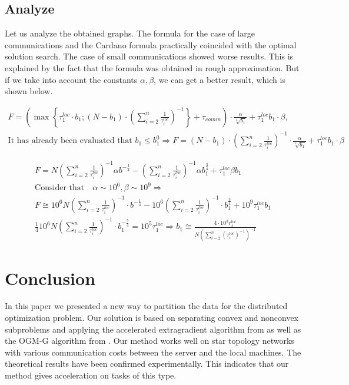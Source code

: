 \documentclass{article}
\begin{document}
\subsection{Analyze}
Let us analyze the obtained graphs. The formula for the case of large communications and the Cardano formula practically coincided with the optimal solution search. The case of small communications showed worse results. This is explained by the fact that the formula was obtained in rough approximation. But if we take into account the constants $\alpha, \beta$, we can get a better result, which is shown below.



\begin{gather*}
    F=\left(\max \left\{\tau_1^{loc} \cdot b_1 ;\left(N-b_1\right) \cdot\left(\sum_{i=2}^n \frac{1}{\tau_i^{loc}}\right)^{-1}\right\}+\tau_{comm}\right) \cdot \frac{\alpha}{\sqrt[4]{b_1}}+\tau_1^{loc} b_1 \cdot \beta, \\
    \text {It has already been evaluated that } b_1 \leq b_1^0 \Rightarrow F=\left(N-b_1\right)\cdot \left(\sum_{i=2}^n \frac{1}{\tau_i^{loc}}\right)^{-1} \cdot \frac{\alpha}{\sqrt[4]{b_1}}+\tau_1^{loc} b_1 \cdot \beta
\end{gather*}


\begin{gather*}
    F=N\left(\sum_{i=2}^n \frac{1}{\tau_i^{loc}}\right)^{-1} \alpha b^{-\frac{1}{4}}-\left(\sum_{i=2}^n \frac{1}{\tau_i^{loc}}\right)^{-1} \alpha b_1^{\frac{3}{4}}+\tau_1^{l o c} \beta b_1 \\
    \text {Consider that} \quad \alpha \sim 10^6, \beta \sim 10^9 \Rightarrow \\ 
    F \cong 10^6 N \left(\sum_{i=2}^n \frac{1}{\tau_i^{loc}}\right)^{-1} \cdot b^{-\frac{1}{4}}-10^6 \left(\sum_{i=2}^n \frac{1}{\tau_i^{loc}}\right)^{-1} \cdot b_1^{\frac{3}{4}}+10^9 \tau_1^{loc} b_1 \\
    \frac{1}{4} 10^6 N \left(\sum_{i=2}^n \frac{1}{\tau_i^{loc}}\right)^{-1} \cdot b_1^{-\frac{5}{4}}=10^5 \tau_1^{loc} \Rightarrow b_1 \cong \frac{4 \cdot 10^3 r_1^{loc}}{N\left(\sum_{i=2}^n\left(\tau_i^{loc}\right)^{-1}\right)^{-1}}
\end{gather*}

\section{Conclusion}

In this paper we presented a new way to partition the data for the distributed optimization problem. Our solution is based on separating convex and nonconvex subproblems and applying the accelerated extragradient algorithm from \citep{kovalev2022optimal} as well as the OGM-G algorithm from \citep{kim2021optimizing}. Our method works well on star topology networks with various communication costs between the server and the local machines. The theoretical results have been confirmed experimentally. This indicates that our method gives acceleration on tasks of this type.


  
\end{document}
